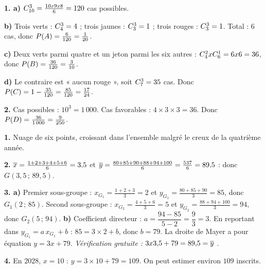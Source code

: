 \begin{corrige}
\textbf{1. a)} $\combi{3}{10} = \frac{10\times9\times8}{6} = 120$ cas
possibles.

\textbf{b)} Trois verts : $\combi{3}{4} = 4$ ; trois jaunes :
$\combi{3}{3} = 1$ ; trois rouges : $\combi{3}{3} = 1$. Total : $6$ cas,
donc $\proba{A} = \frac{6}{120} = \frac{1}{20}$.

\textbf{c)} Deux verts parmi quatre et un jeton parmi les six autres :
$\combi{2}{4}\times\combi{1}{6} = 6\times6 = 36$, donc
$\proba{B} = \frac{36}{120} = \frac{3}{10}$.

\textbf{d)} Le contraire est « aucun rouge », soit
$\combi{3}{7} = 35$ cas. Donc
$\proba{C} = 1-\frac{35}{120} = \frac{85}{120} = \frac{17}{24}$.

\textbf{2.} Cas possibles : $10^{3} = 1\,000$. Cas favorables :
$4\times3\times3 = 36$. Donc
$\proba{D} = \frac{36}{1\,000} = \frac{9}{250}$.
\end{corrige}

\begin{corrige}
\textbf{1.} Nuage de six points, croissant dans l'ensemble malgré le creux de
la quatrième année.

\textbf{2.} $\moy x = \frac{1+2+3+4+5+6}{6} = 3{,}5$ et
$\moy y = \frac{80+85+90+88+94+100}{6} = \frac{537}{6} = 89{,}5$ : donc
$G(3{,}5\,;\,89{,}5)$.

\textbf{3. a)} Premier sous-groupe : $x_{G_{1}} = \frac{1+2+3}{3} = 2$ et
$y_{G_{1}} = \frac{80+85+90}{3} = 85$, donc $G_{1}(2\,;\,85)$. Second
sous-groupe : $x_{G_{2}} = \frac{4+5+6}{3} = 5$ et
$y_{G_{2}} = \frac{88+94+100}{3} = 94$, donc $G_{2}(5\,;\,94)$.
\textbf{b)} Coefficient directeur :
$a = \dfrac{94-85}{5-2} = \dfrac93 = 3$. En reportant dans
$y_{G_{1}} = a\,x_{G_{1}}+b$ : $85 = 3\times2+b$, donc $b = 79$. La droite de
Mayer a pour équation $y = 3x+79$. \emph{Vérification gratuite :}
$3\times3{,}5+79 = 89{,}5 = \moy y$ \checkmark.

\textbf{4.} En $2028$, $x = 10$ : $y = 3\times10+79 = 109$. On peut estimer
environ $109$ inscrits.
\end{corrige}

